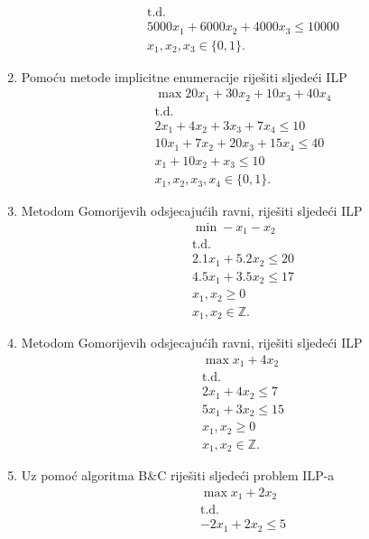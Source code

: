 \documentclass[b5paper, utf8, 11pt, colorlinks]{book}
\theoremstyle{definition}
\begin{document}
\begin{enumerate}
\begin{align*}
  &\mbox{t.d.} \\
  & 5000 x_1 + 6000 x_2 + 4000 x_3 \leq 10000 \\
  & x_1, x_2, x_3 \in \{0, 1\}.
\end{align*}
\item  Pomoću metode implicitne enumeracije riješiti sljedeći ILP
\begin{align*}
	 &\max 20 x_1 + 30 x_2 + 10 x_3 + 40 x_4 \\
	 &\mbox{t.d.}\\
	 & 2x_1 + 4 x_2 + 3 x_3 + 7 x_4 \leq 10 \\
	 & 10 x_1 + 7 x_2 + 20 x_3 + 15 x_4 \leq 40 \\
	 & x_1 + 10 x_2 + x_3 \leq 10 \\
	 & x_1, x_2, x_3, x_4 \in \{0, 1\}.
\end{align*}
	\item Metodom Gomorijevih odsjecajućih ravni, riješiti sljedeći ILP%
	\begin{align*}
		 &\min -x_1 - x_2 \\
		 &\mbox{t.d.}\\
		 & 2.1 x_1 + 5.2x_2 \leq 20 \\
		 & 4.5 x_1 + 3.5 x_2 \leq 17 \\
		 & x_1, x_2 \geq 0 \\
		 & x_1, x_2 \in \mathbb{Z}.
	\end{align*}
\item Metodom Gomorijevih odsjecajućih ravni, riješiti sljedeći ILP%
\begin{align*}
	& \max x_1 + 4 x_2 \\
	& \mbox{t.d.} \\
	& 2 x_1 + 4 x_2 \leq 7 \\
	& 5 x_1 + 3 x_2 \leq 15 \\
	& x_1, x_2 \geq 0 \\
	& x_1, x_2 \in \mathbb{Z}.
	\end{align*}
\item    %
  Uz pomoć algoritma B\&C riješiti sljedeći problem ILP-a
  \begin{align*}
  	 &\max x_1 + 2 x_2 \\
  	 &\mbox{t.d.} \\
  	 & -2x_1 + 2 x_2 \leq 5 \\

\end{align*}
\end{enumerate}
\end{document}
